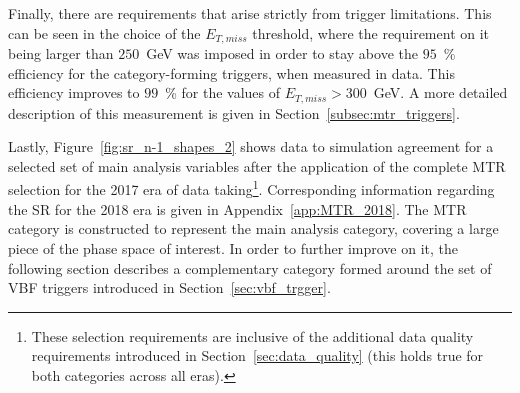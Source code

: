 \hspace{10pt} Finally, there are requirements that arise strictly from trigger limitations. This can be seen in the choice of the $E_{T,miss}$ threshold, where the requirement on it being larger than $250$~GeV was imposed in order to stay above the $95$~\% efficiency for the category-forming triggers, when measured in data. This efficiency improves to $99$~\% for the values of $E_{T,miss}>300$~GeV. A more detailed description of this measurement is given in Section~\ref{subsec:mtr_triggers}.

\hspace{10pt} Lastly, Figure~\ref{fig:sr_n-1_shapes_2} shows data to simulation agreement for a selected set of main analysis variables after the application of the complete MTR selection for the 2017 era of data taking\footnote{These selection requirements are inclusive of the additional data quality requirements introduced in Section~\ref{sec:data_quality} (this holds true for both categories across all eras).}. Corresponding information regarding the SR for the 2018 era is given in Appendix~\ref{app:MTR_2018}. The MTR category is constructed to represent the main analysis category, covering a large piece of the phase space of interest. In order to further improve on it, the following section describes a complementary category formed around the set of VBF triggers introduced in Section~\ref{sec:vbf_trgger}.



